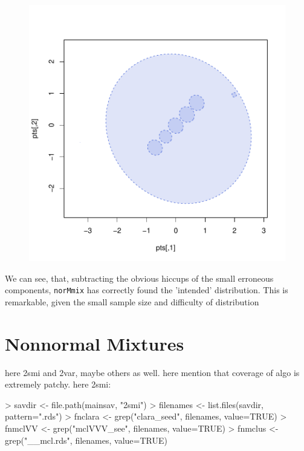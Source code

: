 \begin{figure}[h!]
    \centering
\begin{Schunk}
\end{Schunk}
\includegraphics{chapter3-fig214fit}
\end{figure}

We can see, that, subtracting the obvious hiccups of the small erroneous
components, {\tt norMmix} has correctly found the 'intended' 
distribution. This is remarkable, given the small sample size and difficulty of distribution

\section{Nonnormal Mixtures}

here 2smi and 2var, maybe others as well.
here mention that coverage of algo is extremely patchy.
here 2smi:

\begin{Schunk}
\begin{Sinput}
>     savdir <- file.path(mainsav, "2smi")
>     filenames <- list.files(savdir, pattern=".rds")
>     fnclara <- grep("clara_seed", filenames, value=TRUE)
>     fnmclVV <- grep("mclVVV_see", filenames, value=TRUE)
>     fnmclus <- grep("__mcl.rds",  filenames, value=TRUE)
\end{Sinput}
\end{Schunk}


